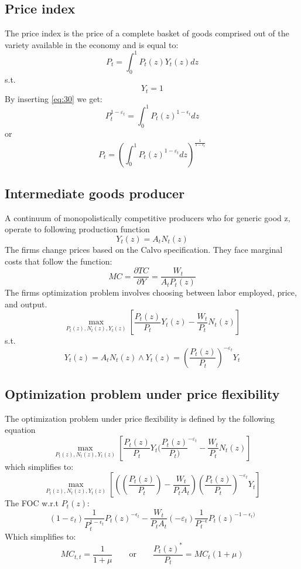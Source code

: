 \documentclass[10pt,a4paper]{article}
\begin{document}
\subsection{Price index}
The price index is the price of a complete basket of goods comprised out of the variety available in the economy and is equal to:
$$P_{t}=\int_{0}^{1}P_{t}(z)Y_{t}(z)dz$$ s.t. $$Y_{t}=1$$
By inserting \eqref{eq:30} we get:
\begin{equation}
P_{t}^{1-\varepsilon_{t}}=\int_{0}^{1}P_{t}(z)^{1-\epsilon_{t}}dz
\end{equation}
or
\begin{equation}\label{eq:32}
P_{t}=(\int_{0}^{1}P_{t}(z)^{1-\varepsilon_{t}}dz)^\frac{1}{1-\epsilon_{t}}
\end{equation}
\subsection{Intermediate goods producer}
A continuum of monopolistically competitive producers who for generic good z, operate to following production function
\begin{equation}
Y_{t}(z)=A_{t}N_{t}(z)
\end{equation}
The firms change prices based on the Calvo specification. They face marginal costs that follow the function:
$$ MC = \frac{\partial TC}{\partial Y}= \frac{W_t}{A_tP_t(z)} $$
The firms optimization problem involves choosing between labor employed, price, and output.
$$ \max_{P_t(z), N_t(z), Y_t(z)}
\left[
\dfrac{P_t(z)}{P_t} Y_t(z)
-
\dfrac{W_t}{P_t} N_t(z)
\right]
$$
s.t.
$$
Y_t(z)=A_tN_t(z)  \wedge  Y_t(z)=(\frac{P_t(z)}{P_t})^{-\varepsilon_t}Y_t
$$
\subsection{Optimization problem under price flexibility}
The optimization problem under price flexibility is defined by the following equation
$$ \max_{P_t(z), N_t(z), Y_t(z)}
\left[
\dfrac{P_t(z)}{P_t} Y_t(\frac{P_t(z)}{P_t)}^{-\varepsilon_t}
-
\frac{W_t}{P_t}N_t(z)
\right]
$$
which simplifies to:
$$ \max_{P_t(z), N_t(z), Y_t(z)}
\left[
((\dfrac{P_t(z)}{P_t})-\frac{W_t}{P_tA_t})(\frac{P_t(z)}{P_t})^{-\varepsilon_t}Y_t
\right]
$$
The FOC w.r.t $P_t(z)$:
$$
(1-\varepsilon_t)\frac{1}{P_t^{1-\epsilon_t}} P_t(z)^{-\epsilon_t} -
 \frac{W_t}{P_tA_t}(-\varepsilon_t)\frac{1}{P_t^{-\epsilon}} P_t(z)^{-1-\epsilon_t)}
$$
Which simplifies to:
\begin{equation}\label{eq:34}
MC_{t,t}=\frac{1}{1+\mu} \qquad \textrm{or} \qquad \frac{P_t(z)^*}{P_t} = MC_t(1+\mu)
\end{equation}
\end{document}

